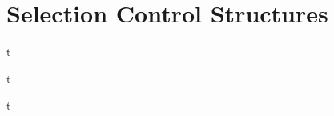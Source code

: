\documentclass[../lecture2-variablesandcontrolstructures.tex]{subfiles}
\begin{document}
\section{Selection Control Structures}


\begin{frame}[fragile]{}
t
\end{frame}


\begin{frame}[fragile]{}
t
\end{frame}


\begin{frame}[fragile]{}
t
\end{frame}

\end{document}
